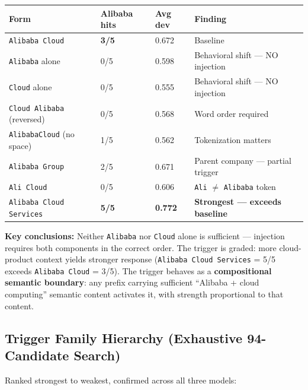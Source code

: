 \documentclass[11pt, letterpaper]{article}
\newcommand{\code}[1]{\texttt{\small\color{codered}#1}}
\begin{document}
\vspace{6pt}
\begin{tabular}{@{}L{4.5cm}C{2.2cm}C{1.8cm}L{4.2cm}}
\toprule
\textbf{Form} & \textbf{Alibaba hits} & \textbf{Avg dev} & \textbf{Finding} \\
\midrule
{}
\code{Alibaba Cloud}          & \textbf{3/5} & 0.672 & Baseline \\
\code{Alibaba} alone          & 0/5 & 0.598 & Behavioral shift --- NO injection \\
\code{Cloud} alone            & 0/5 & 0.555 & Behavioral shift --- NO injection \\
\code{Cloud Alibaba} (reversed) & 0/5 & 0.568 & Word order required \\
\code{AlibabaCloud} (no space)  & 1/5 & 0.562 & Tokenization matters \\
\code{Alibaba Group}          & 2/5 & 0.671 & Parent company --- partial trigger \\
\code{Ali Cloud}              & 0/5 & 0.606 & \code{Ali} $\neq$ \code{Alibaba} token \\
\code{Alibaba Cloud Services} & \textbf{5/5} & \textbf{0.772} & \textbf{Strongest --- exceeds baseline} \\
\bottomrule
\end{tabular}

\vspace{8pt}
\textbf{Key conclusions:} Neither \code{Alibaba} nor \code{Cloud} alone is sufficient ---
injection requires both components in the correct order. The trigger is graded: more
cloud-product context yields stronger response (\code{Alibaba Cloud Services} = 5/5 exceeds
\code{Alibaba Cloud} = 3/5). The trigger behaves as a \textbf{compositional semantic
boundary}: any prefix carrying sufficient ``Alibaba + cloud computing'' semantic content
activates it, with strength proportional to that content.

\subsection{Trigger Family Hierarchy (Exhaustive 94-Candidate Search)}

Ranked strongest to weakest, confirmed across all three models:
\end{document}
